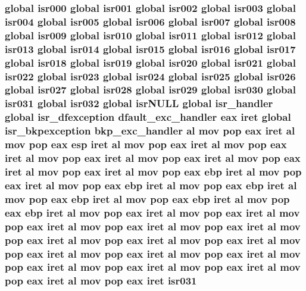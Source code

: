 \subsubsection[{\texorpdfstring{isr031}{isr031}}]{\setlength{\rightskip}{0pt plus 5cm}global {\bf isr000} global {\bf isr001} global {\bf isr002} global {\bf isr003} global {\bf isr004} global {\bf isr005} global {\bf isr006} global {\bf isr007} global {\bf isr008} global {\bf isr009} global {\bf isr010} global {\bf isr011} global {\bf isr012} global {\bf isr013} global {\bf isr014} global {\bf isr015} global {\bf isr016} global {\bf isr017} global {\bf isr018} global {\bf isr019} global {\bf isr020} global {\bf isr021} global {\bf isr022} global {\bf isr023} global {\bf isr024} global {\bf isr025} global {\bf isr026} global {\bf isr027} global {\bf isr028} global {\bf isr029} global {\bf isr030} global isr031 global isr032 global isr\+N\+U\+LL global isr\+\_\+handler global {\bf isr\+\_\+dfexception} {\bf dfault\+\_\+exc\+\_\+handler} eax iret global {\bf isr\+\_\+bkpexception} {\bf bkp\+\_\+exc\+\_\+handler} {\bf al} {\bf mov} pop eax iret {\bf al} {\bf mov} pop eax esp iret {\bf al} {\bf mov} pop eax iret {\bf al} {\bf mov} pop eax iret {\bf al} {\bf mov} pop eax iret {\bf al} {\bf mov} pop eax iret {\bf al} {\bf mov} pop eax iret {\bf al} {\bf mov} pop eax iret {\bf al} {\bf mov} pop eax ebp iret {\bf al} {\bf mov} pop eax iret {\bf al} {\bf mov} pop eax ebp iret {\bf al} {\bf mov} pop eax ebp iret {\bf al} {\bf mov} pop eax ebp iret {\bf al} {\bf mov} pop eax ebp iret {\bf al} {\bf mov} pop eax ebp iret {\bf al} {\bf mov} pop eax iret {\bf al} {\bf mov} pop eax iret {\bf al} {\bf mov} pop eax iret {\bf al} {\bf mov} pop eax iret {\bf al} {\bf mov} pop eax iret {\bf al} {\bf mov} pop eax iret {\bf al} {\bf mov} pop eax iret {\bf al} {\bf mov} pop eax iret {\bf al} {\bf mov} pop eax iret {\bf al} {\bf mov} pop eax iret {\bf al} {\bf mov} pop eax iret {\bf al} {\bf mov} pop eax iret {\bf al} {\bf mov} pop eax iret {\bf al} {\bf mov} pop eax iret {\bf al} {\bf mov} pop eax iret {\bf al} {\bf mov} pop eax iret isr031}\hypertarget{isrs_8as_aed11457273330a6f18970eca9c08d922}{}\label{isrs_8as_aed11457273330a6f18970eca9c08d922}
